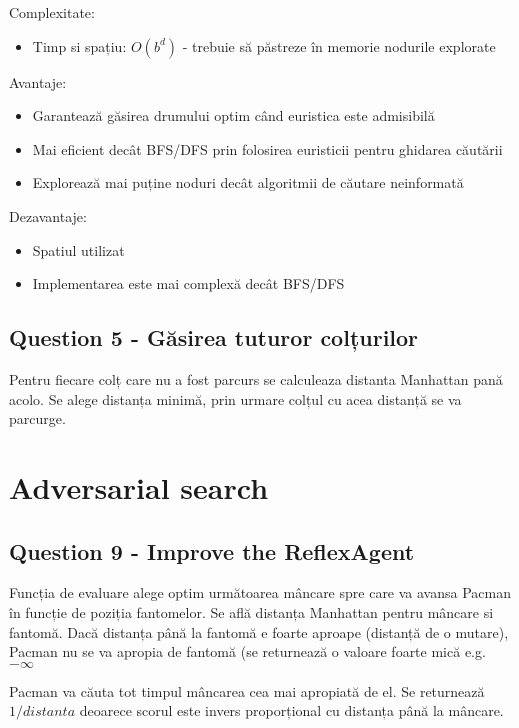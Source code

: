 \par Complexitate:
\begin {itemize}
	\item Timp si spațiu: $O(b^d)$ - trebuie să păstreze în memorie nodurile explorate
\end {itemize}

\par Avantaje:
\begin {itemize}
	\item Garantează găsirea drumului optim când euristica este admisibilă
	\item Mai eficient decât BFS/DFS prin folosirea euristicii pentru ghidarea căutării
	\item Explorează mai puține noduri decât algoritmii de căutare neinformată
\end {itemize}

\par Dezavantaje:
\begin {itemize}
	\item Spatiul utilizat
	\item Implementarea este mai complexă decât BFS/DFS
\end {itemize}

\pagebreak
\subsection {Question 5 - Găsirea tuturor colțurilor}
\par Pentru fiecare colț care nu a fost parcurs se calculeaza distanta Manhattan pană acolo. Se alege distanța minimă, prin urmare colțul cu acea distanță se va parcurge.

\section{Adversarial search}
\subsection{Question 9 - Improve the ReflexAgent} 

\par Funcția de evaluare alege optim următoarea mâncare spre care va avansa Pacman în funcție de poziția fantomelor. Se află distanța Manhattan pentru mâncare si fantomă. Dacă distanța până la fantomă e foarte aproape (distanță de o mutare), Pacman nu se va apropia de fantomă (se returnează o valoare foarte mică e.g. $	- \infty$
\par Pacman va căuta tot timpul mâncarea cea mai apropiată de el. Se returnează $1 / distanta$ deoarece scorul este invers proporțional cu distanța până la mâncare. 


